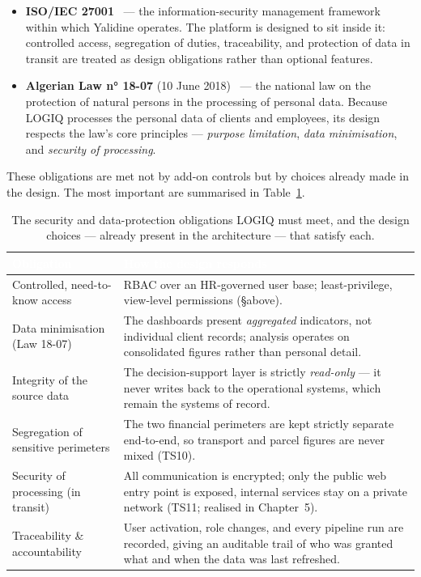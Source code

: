 \begin{itemize}[noitemsep]
    \item \textbf{ISO/IEC 27001}~\parencite{iso27001} --- the information-security management framework
          within which Yalidine operates. The platform is designed to sit inside it: controlled access,
          segregation of duties, traceability, and protection of data in transit are treated as design
          obligations rather than optional features.
    \item \textbf{Algerian Law n° 18-07} (10 June 2018)~\parencite{loi1807} --- the national law on the
          protection of natural persons in the processing of personal data. Because LOGIQ processes the
          personal data of clients and employees, its design respects the law's core principles ---
          \emph{purpose limitation}, \emph{data minimisation}, and \emph{security of processing}.
\end{itemize}

These obligations are met not by add-on controls but by choices already made in the design. The most
important are summarised in Table~\ref{tab:ch4-conformity}.

\begin{table}[H]
\centering
\caption{The security and data-protection obligations LOGIQ must meet, and the design choices ---
already present in the architecture --- that satisfy each.}
\label{tab:ch4-conformity}
\renewcommand{\arraystretch}{1.35}
\begin{tabularx}{\linewidth}{|>{\raggedright\arraybackslash}p{4.3cm}|>{\raggedright\arraybackslash}X|}
\hline
\rowcolor{tblheader}
\textcolor{white}{\textbf{Obligation}} & \textcolor{white}{\textbf{How the design responds}} \\
\hline
Controlled, need-to-know access & RBAC over an HR-governed user base; least-privilege, view-level
permissions (\S above). \\
Data minimisation (Law 18-07) & The dashboards present \emph{aggregated} indicators, not individual
client records; analysis operates on consolidated figures rather than personal detail. \\
Integrity of the source data & The decision-support layer is strictly \emph{read-only} --- it never
writes back to the operational systems, which remain the systems of record. \\
Segregation of sensitive perimeters & The two financial perimeters are kept strictly separate
end-to-end, so transport and parcel figures are never mixed (TS10). \\
Security of processing (in transit) & All communication is encrypted; only the public web entry point is
exposed, internal services stay on a private network (TS11; realised in Chapter~5). \\
Traceability \& accountability & User activation, role changes, and every pipeline run are recorded,
giving an auditable trail of who was granted what and when the data was last refreshed. \\
\hline
\end{tabularx}
\end{table}

